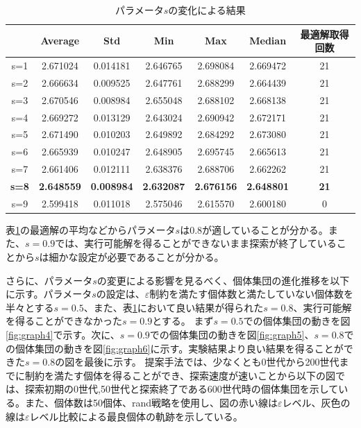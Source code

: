\documentclass[a4paper,12pt]{jsreport}
\begin{document}
\begin{table}[htbp]
\begin{center}
\caption{パラメータ$s$の変化による結果}
\label{tbl:s}
\begin{tabular}{|c|c|c|c|c|c|c|}
\hline
      & Average & Std & Min & Max & Median &  最適解取得回数\\ \hline
s=1 & 2.671024 & 0.014181 & 2.646765 & 2.698084 & 2.669472 & 21 \\ \hline
s=2 & 2.666634 & 0.009525 & 2.647761 & 2.688299 & 2.664439 & 21 \\ \hline
s=3 & 2.670546 & 0.008984 & 2.655048 & 2.688102 & 2.668138 & 21 \\ \hline
s=4 & 2.669272 & 0.013129 & 2.643024 & 2.690942 & 2.672171 & 21 \\ \hline
s=5 & 2.671490 & 0.010203 & 2.649892 & 2.684292 & 2.673080 & 21 \\ \hline
s=6 & 2.665939 & 0.010247 & 2.648905 & 2.695745 & 2.665613 & 21 \\ \hline
s=7 & 2.661406 & 0.012111 & 2.638376 & 2.688706 & 2.662262 & 21 \\ \hline
\bf s=8 &\bf 2.648559 &\bf 0.008984 &\bf 2.632087 &\bf 2.676156 &\bf 2.648801 &\bf 21 \\ \hline
s=9 & 2.599418 & 0.011018 & 2.575046 & 2.615570 & 2.600180 & 0 \\ \hline
\end{tabular}
\end{center}
\end{table}

表\ref{tbl:s}の最適解の平均などからパラメータ$s$は0.8が適していることが分かる。また、$s=0.9$では、実行可能解を得ることができないまま探索が終了していることから$s$は細かな設定が必要であることが分かる。

さらに、パラメータ$s$の変更による影響を見るべく、個体集団の進化推移を以下に示す。パラメータ$s$の設定は、$\varepsilon$制約を満たす個体数と満たしていない個体数を半々とする$s=0.5$、また、表\ref{tbl:s}において良い結果が得られた$s=0.8$、実行可能解を得ることができなかった$s=0.9$とする。
まず$s=0.5$での個体集団の動きを図\ref{fig:graph4}で示す。次に、$s=0.9$での個体集団の動きを図\ref{fig:graph5}、$s=0.8$での個体集団の動きを図\ref{fig:graph6}に示す。実験結果より良い結果を得ることができた$s=0.8$の図を最後に示す。
提案手法では、少なくとも0世代から200世代までに制約を満たす個体を得ることができ、探索速度が速いことから以下の図では、探索初期の0世代,50世代と探索終了である600世代時の個体集団を示している。また、個体数は50個体、rand戦略を使用し、図の赤い線は$\varepsilon$レベル、灰色の線は$\varepsilon$レベル比較による最良個体の軌跡を示している。
\end{document}
